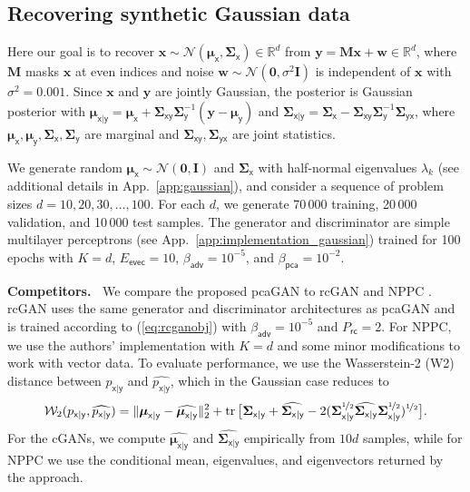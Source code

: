 \documentclass{article}
\theoremstyle{plain}
\theoremstyle{definition}
\theoremstyle{remark}
\renewcommand{\hat}{\widehat}
\renewcommand{\vec}[1]{\ensuremath{\boldsymbol{#1}}}
\newcommand{\mc}[1]{\ensuremath{\mathcal{#1}}}
\newcommand{\Real}{{\mathbb{R}}}
\DeclareMathOperator{\tr}{tr}
\renewcommand{\eqref}[1]{(\ref{eq:#1})}
\newcommand{\appref}[1]{App.~\ref{app:#1}}
\newcommand{\train}{_{\mathsf{rc}}}
\newcommand{\evec}{_{\mathsf{evec}}}
\newcommand{\betaadv}{\beta_{\mathsf{adv}}}
\newcommand{\betapca}{\beta_{\mathsf{pca}}}
\newcommand{\pxgy}{p_{\mathsf{x}|\mathsf{y}}}
\newcommand{\mux}{\vec{\mu}_{\mathsf{x}}}
\newcommand{\muy}{\vec{\mu}_{\mathsf{y}}}
\newcommand{\muxgy}{\vec{\mu}_{\mathsf{x}|\mathsf{y}}}
\newcommand{\Sigx}{\vec{\Sigma}_{\mathsf{x}}}
\newcommand{\Sigxy}{\vec{\Sigma}_{\mathsf{xy}}}
\newcommand{\Sigyx}{\vec{\Sigma}_{\mathsf{yx}}}
\newcommand{\Sigy}{\vec{\Sigma}_{\mathsf{y}}}
\newcommand{\Sigxgy}{\vec{\Sigma}_{\mathsf{x}|\mathsf{y}}}
\begin{document}
\subsection{Recovering synthetic Gaussian data} \label{sec:gaussianexp}

Here our goal is to recover $\vec{x}\sim\mc{N}(\mux, \Sigx)\in \Real^d$ from $\vec{y}=\vec{Mx} + \vec{w}\in\Real^d$, where $\vec{M}$ masks $\vec{x}$ at even indices and noise $\vec{w}\sim\mc{N}(\vec{0}, \sigma^2\vec{I})$ is independent of $\vec{x}$ with $\sigma^2=0.001$.
Since $\vec{x}$ and $\vec{y}$ are jointly Gaussian, the posterior is Gaussian posterior with $\muxgy = \mux + \Sigxy\Sigy^{-1}(\vec{y} - \muy)$ and $\Sigxgy = \Sigx - \Sigxy\Sigy^{-1}\Sigyx$, where 
$\mux, \muy, \Sigx, \Sigy$ are marginal and $\Sigxy,\Sigyx$ are joint statistics.

We generate random $\mux\sim\mc{N}(\vec{0},\vec{I})$ and $\Sigx$ with half-normal eigenvalues $\lambda_k$ (see additional details in \appref{gaussian}), and consider a sequence of problem sizes $d=10,20,30,\dots,100$.
For each $d$, we generate 70\,000 training, 20\,000 validation, and 10\,000 test samples. 
The generator and discriminator are simple multilayer perceptrons (see \appref{implementation_gaussian}) trained for 100 epochs with $K=d$, $E\evec=10$, $\betaadv=10^{-5}$, and $\betapca=10^{-2}$.

\textbf{Competitors.~}
We compare the proposed pcaGAN to rcGAN \cite{Bendel:NIPS:23} and NPPC \cite{Nehme:NIPS:23}.
rcGAN uses the same generator and discriminator architectures as pcaGAN and is trained according to \eqref{rcganobj} with $\betaadv=10^{-5}$ and $P\train=2$. 
For NPPC, we use the authors' implementation \cite{Nehme:github:23} with $K=d$ and some minor modifications to work with vector data.
To evaluate performance, we use the Wasserstein-2 (W2) distance between $\pxgy$ and $\hat{\pxgy}$, which in the Gaussian case reduces to 
\begin{align}
\mc{W}_2(\pxgy, \hat{\pxgy}) = \|\muxgy - \hat{\muxgy}\|_2^2 + \tr\big[\Sigxgy + \hat{\Sigxgy} - 2(\Sigxgy^{\nicefrac{1}{2}}\hat{\Sigxgy}\Sigxgy^{\nicefrac{1}{2}})^{\nicefrac{1}{2}}\big]
\label{eq:W2}.
\end{align}
For the cGANs, we compute $\hat{\muxgy}$ and $\hat{\Sigxgy}$ empirically from $10d$ samples, while for NPPC we use the conditional mean, eigenvalues, and eigenvectors returned by the approach.
\end{document}
